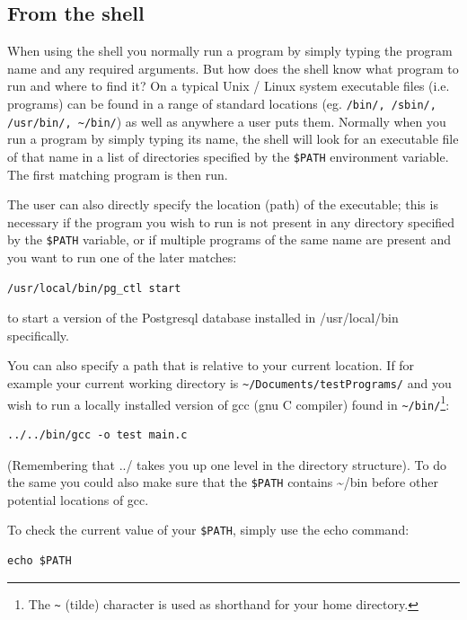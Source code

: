 \documentclass[11pt]{article}
\begin{document}
\subsection{From the shell}
\label{sec-3-1}

When using the shell you normally run a program by simply typing the
program name and any required arguments. But how does the shell know
what program to run and where to find it? On a typical Unix / Linux
system executable files (i.e. programs) can be found in a range of
standard locations (eg. \texttt{/bin/, /sbin/, /usr/bin/, \textasciitilde{}/bin/}) as well as
anywhere a user puts them. Normally when you run a program by simply
typing its name, the shell will look for an executable file of that name
in a list of directories specified by the \texttt{\$PATH} environment variable.
The first matching program is then run.

The user can also directly specify the location (path) of the
executable; this is necessary if the program you wish to run is not
present in any directory specified by the \texttt{\$PATH} variable, or if
multiple programs of the same name are present and you want to run one
of the later matches:


\begin{verbatim}
/usr/local/bin/pg_ctl start
\end{verbatim}

to start a version of the Postgresql database installed in
/usr/local/bin specifically.

You can also specify a path that is relative to your current location.
If for example your current working directory is
\texttt{\textasciitilde{}/Documents/testPrograms/} and you wish to run a locally installed
version of gcc (gnu C compiler) found in \texttt{\textasciitilde{}/bin/}\footnote{The \texttt{\textasciitilde{}} (tilde) character is used as shorthand for your home directory.
 }:


\begin{verbatim}
../../bin/gcc -o test main.c
\end{verbatim}

(Remembering that ../ takes you up one level in the directory
structure). To do the same you could also make sure that the \texttt{\$PATH}
contains \~{}/bin before other potential locations of gcc.

To check the current value of your \texttt{\$PATH}, simply use the echo command:


\begin{verbatim}
echo $PATH
\end{verbatim}
\end{document}
